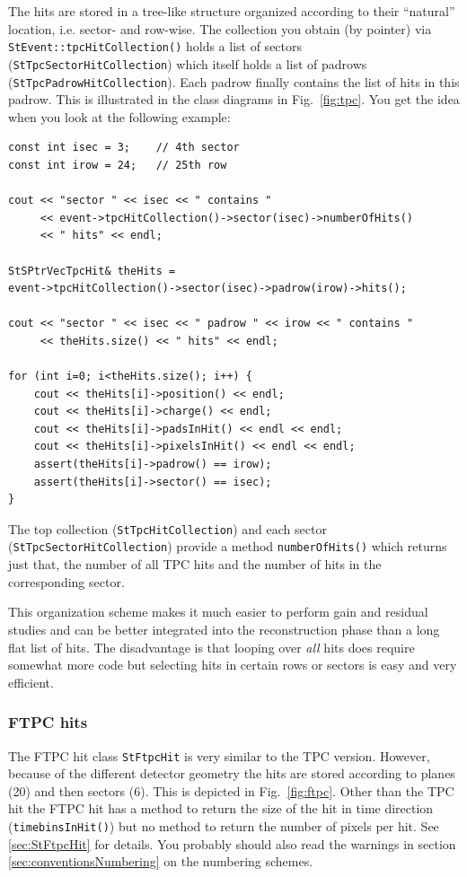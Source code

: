 \documentclass[twoside]{article}
\begin{document}
The hits are stored in a tree-like structure organized
according to their ``natural'' location, i.e. sector- and row-wise.
The collection you obtain (by pointer) via
\texttt{StEvent::tpcHitCollection()} holds a list of sectors
(\texttt{StTpcSectorHitCollection}) which itself holds a list of padrows
(\texttt{StTpcPadrowHitCollection}). Each padrow finally contains the list of
hits in this padrow. This is illustrated in the class diagrams in
Fig.~\ref{fig:tpc}. You get the idea when you look at the following
example:
\begin{verbatim}
const int isec = 3;    // 4th sector
const int irow = 24;   // 25th row

cout << "sector " << isec << " contains "
     << event->tpcHitCollection()->sector(isec)->numberOfHits()
     << " hits" << endl;

StSPtrVecTpcHit& theHits =
event->tpcHitCollection()->sector(isec)->padrow(irow)->hits();

cout << "sector " << isec << " padrow " << irow << " contains "
     << theHits.size() << " hits" << endl;

for (int i=0; i<theHits.size(); i++) {
    cout << theHits[i]->position() << endl;
    cout << theHits[i]->charge() << endl;
    cout << theHits[i]->padsInHit() << endl << endl;
    cout << theHits[i]->pixelsInHit() << endl << endl;
    assert(theHits[i]->padrow() == irow);
    assert(theHits[i]->sector() == isec);
}
\end{verbatim}
The top collection (\texttt{StTpcHitCollection}) and each sector 
(\texttt{StTpcSectorHitCollection}) provide a method
\texttt{numberOfHits()} which returns just that, the number of all TPC
hits and the number of hits in the corresponding sector.

This organization scheme makes it much easier to perform gain and
residual studies and can be better integrated into the reconstruction
phase than a long flat list of hits. The disadvantage is that looping
over \emph{all} hits does require somewhat more code but selecting
hits in certain rows or sectors is easy and very efficient.

\subsubsection{FTPC hits}

The FTPC hit class \texttt{StFtpcHit} is very similar to the TPC
version.  However, because of the different detector geometry the hits
are stored according to planes (20) and then sectors (6). This is
depicted in Fig.~\ref{fig:ftpc}. Other than the TPC hit the FTPC hit
has a method to return the size of the hit in time direction
(\texttt{timebinsInHit()}) but no method to return the number of
pixels per hit. See \ref{sec:StFtpcHit} for details.  You probably
should also read the warnings in section
\ref{sec:conventionsNumbering} on the numbering schemes.
\end{document}
